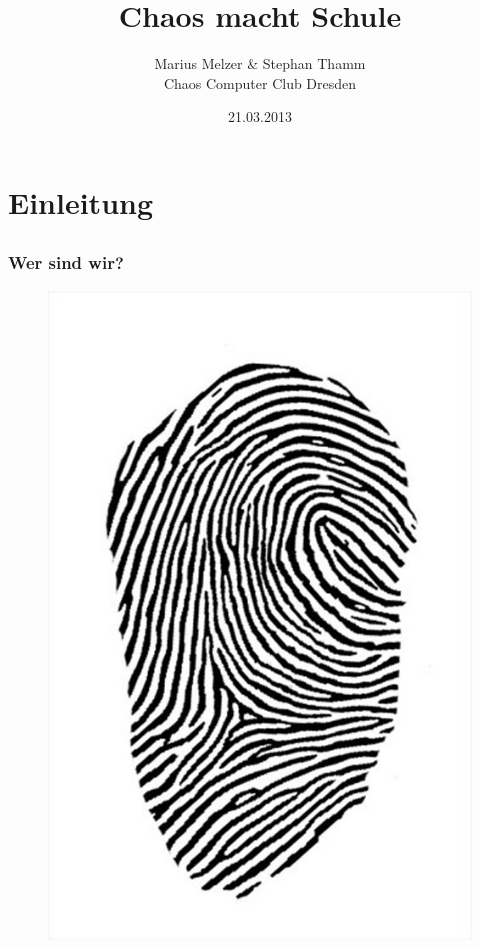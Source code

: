 \documentclass[12pt]{beamer}
\title{Chaos macht Schule}
\author{\small Marius Melzer \& Stephan Thamm\\\large Chaos Computer Club Dresden}
\date{21.03.2013}
\begin{document}
\maketitle

\section{Einleitung}
\subsection{}

\begin{frame}
  \frametitle{Wer sind wir?}
  \begin{figure}
    \includegraphics[height=0.7\textheight]{img/fingerabdruck.jpg}
  \end{figure}
\end{frame}
\end{document}
